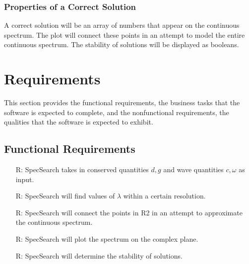 \documentclass[12pt]{article}
\newcounter{reqnum} %
\begin{document}
\subsubsection{Properties of a Correct Solution} \label{sec_CorrectSolution}

\noindent
A correct solution will be an array of numbers that appear on the continuous 
spectrum. The plot will connect these points in an attempt to model the entire 
continuous spectrum. The stability of solutions will be displayed as booleans. 

\section{Requirements}

This section provides the functional requirements, the business tasks that the
software is expected to complete, and the nonfunctional requirements, the
qualities that the software is expected to exhibit.\\


\subsection{Functional Requirements}

\noindent \begin{itemize}

\item[R\refstepcounter{reqnum}\thereqnum \label{R_Inputs}:] SpecSearch takes in 
conserved quantities $d,g$ and wave quantities $c,\omega$ as input. 

\item[R\refstepcounter{reqnum}\thereqnum \label{R_OutputInputs}:] SpecSearch 
will find values of $\lambda$ within a certain resolution.

\item[R\refstepcounter{reqnum}\thereqnum \label{R_Calculate}:] SpecSearch will 
connect the points in R2 in an attempt to approximate the continuous spectrum.

\item[R\refstepcounter{reqnum}\thereqnum \label{R_VerifyOutput}:] SpecSearch 
will plot the spectrum on the complex plane. 

\item[R\refstepcounter{reqnum}\thereqnum \label{R_VerifyOutput}:] SpecSearch 
will determine the stability of solutions.  


\end{itemize}
\end{document}
